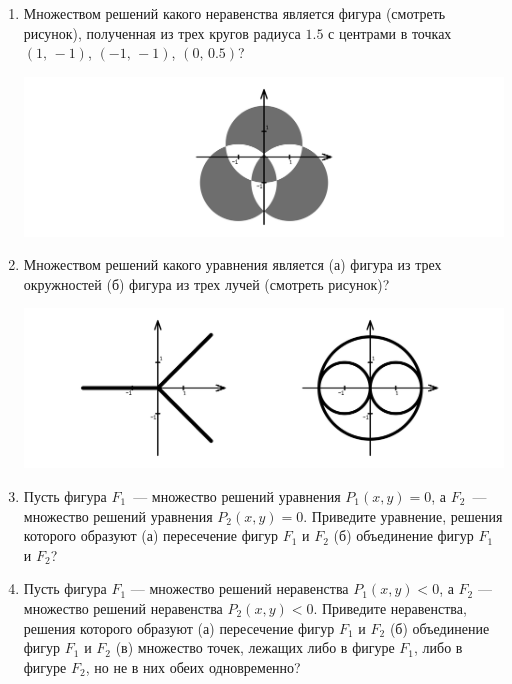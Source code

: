 \begin{enumerate}
\item Множеством решений какого неравенства является фигура (смотреть рисунок), полученная из трех кругов радиуса $1.5$ с центрами в точках $(1,\,-1)$, $(-1,\,-1)$, $(0,\,0.5)$?

\centerline{\includegraphics[width=13.75cm]{stats/2018/graph/3}}

\item Множеством решений какого уравнения является (а) фигура из трех окружностей (б) фигура из трех лучей (смотреть рисунок)?

\centerline{\includegraphics[width=13.75cm]{stats/2018/graph/4}}

\item Пусть фигура $F_1$~— множество решений уравнения $P_1(x,y) = 0$, а $F_2$~— множество решений уравнения $P_2 (x,y) = 0$. Приведите уравнение, решения которого образуют (а) пересечение фигур $F_1$ и $F_2$ (б) объединение фигур $F_1$ и $F_2$?

\item Пусть фигура $F_1$ — множество решений неравенства $P_1(x,y) < 0$, а $F_2$ — множество решений неравенства $P_2 (x,y) < 0$. Приведите неравенства, решения которого образуют (а) пересечение фигур $F_1$ и $F_2$ (б) объединение фигур $F_1$ и $F_2$ (в) множество точек, лежащих либо в фигуре $F_1$, либо в фигуре $F_2$, но не в них обеих одновременно?

\end{enumerate}